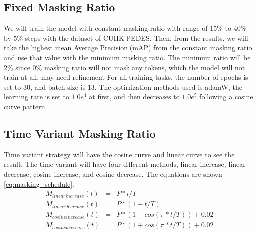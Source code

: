 
\subsection{Fixed Masking Ratio}
We will train the model with constant masking ratio with range of 15\% to 40\% by 5\% steps with the dataset of CUHK-PEDES. Then, from the results, we will take the highest mean Average Precision (mAP) from the constant masking ratio and use that value with the minimum masking ratio. The minimum ratio will be 2\% since 0\% masking ratio will not mask any tokens, which the model will not train at all. 
{\color{red} may need refinement}
For all training tasks, the number of epochs is set to 30, and batch size is 13. The optimization methods used is adamW, the learning rate is set to $1.0e^4$ at first, and then decreases to $1.0e^5$ following a cosine curve pattern.


\subsection{Time Variant Masking Ratio}
Time variant strategy will have the cosine curve and linear curve to see the result. The time variant will have four different methods, linear increase, linear decrease, cosine increase, and cosine decrease. The equations are shown \ref{eq:masking_schedule}. 
\begin{eqnarray}
M_{linear increase}\left( t \right) &=& P*t/T \\
M_{linear decrease}\left( t \right) &=& P*\left(1-t/T\right) \\
M_{cosine increase}\left(t\right) &=& P*\left(1-cos\left(\pi*t/T\right)\right) + 0.02 \\
M_{cosine decrease}\left(t\right) &=& P*\left(1+cos\left(\pi*t/T\right)\right) + 0.02 
\label{eq:masking_schedule}
\end{eqnarray}

